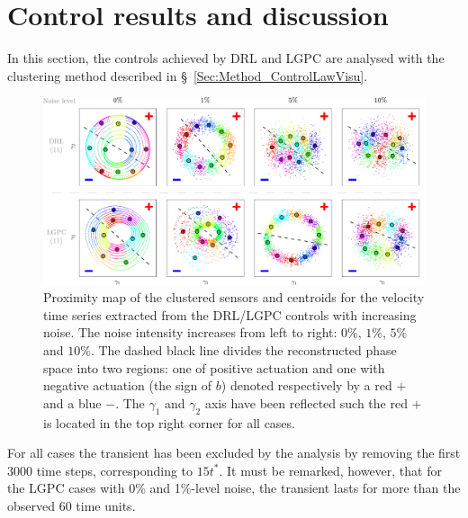\section{Control results and discussion \label{s:interpretability}}
In this section, the controls achieved by DRL and LGPC are analysed with the clustering method described in \S~\ref{Sec:Method_ControlLawVisu}.

\begin{figure}[t]
    \centering
    \includegraphics[width=0.99\linewidth]{Figures/10.pdf}
    \caption{Proximity map of the clustered sensors and centroids for the velocity time series extracted from the DRL/LGPC controls with increasing noise. The noise intensity increases from left to right: $0\%$, $1\%$, $5\%$ and $10\%$. The dashed black line divides the reconstructed phase space into two regions: one of positive actuation and one with negative actuation (the sign of $b$) denoted respectively by a red $+$ and a blue $-$. The $\gamma_1$ and $\gamma_2$ axis have been reflected such the red $+$ is located in the top right corner for all cases.}
    \label{fig:CL_Noise}
\end{figure}

For all cases the transient has been excluded by the analysis by removing the first $3000$ time steps, corresponding to $15t^*$. It must be remarked, however, that for the LGPC cases with 0\% and 1\%-level noise, the transient lasts for more than the observed $60$ time units.

